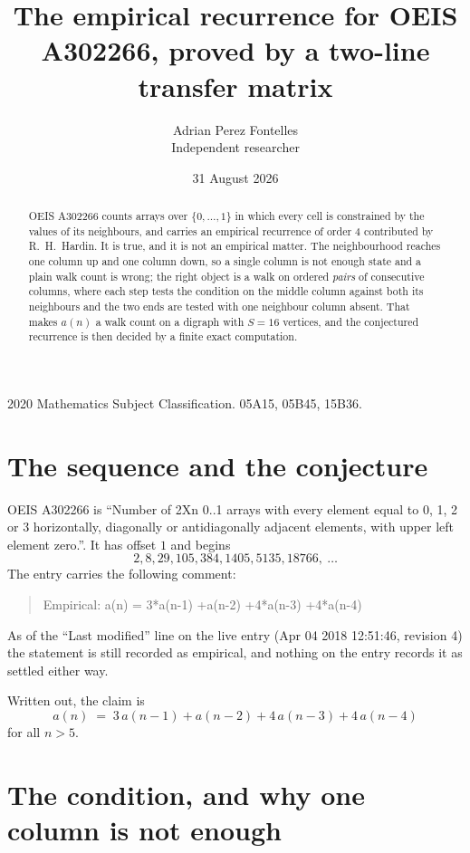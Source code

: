 \documentclass[11pt,a4paper]{article}
\title{The empirical recurrence for OEIS A302266, proved by a two-line transfer matrix}
\author{Adrian Perez Fontelles\\ \small Independent researcher}
\date{31 August 2026}
\theoremstyle{plain}
\theoremstyle{definition}
\begin{document}
\maketitle

\begin{abstract}
OEIS A302266 counts arrays over $\{0,\dots,1\}$ in which every cell is constrained by the
values of its neighbours, and carries an empirical recurrence of order $4$ contributed
by R.~H.~Hardin. It is true, and it is not an empirical matter. The neighbourhood reaches one
column up and one column down, so a single column is not enough state and a plain walk count
is wrong; the right object is a walk on ordered \emph{pairs} of consecutive columns, where
each step tests the condition on the middle column against both its neighbours and the two
ends are tested with one neighbour column absent. That makes $a(n)$ a walk count on a digraph
with $S=16$ vertices, and the conjectured recurrence is then decided by a finite exact
computation.
\end{abstract}

\noindent\small 2020 Mathematics Subject Classification. 05A15, 05B45, 15B36.\normalsize

\section{The sequence and the conjecture}

OEIS A302266 is ``Number of 2Xn 0..1 arrays with every element equal to 0, 1, 2 or 3 horizontally, diagonally or antidiagonally adjacent elements, with upper left element zero.''. It has offset $1$ and begins
\[
2, 8, 29, 105, 384, 1405, 5135, 18766,\ \dots
\]
The entry carries the following comment:
\begin{quote}\small
Empirical: a(n) = 3*a(n-1) +a(n-2) +4*a(n-3) +4*a(n-4)
\end{quote}
As of the ``Last modified'' line on the live entry (Apr 04 2018 12:51:46, revision 4) the statement is
still recorded as empirical, and nothing on the entry records it as settled either way.

Written out, the claim is
\begin{equation}\label{eq:conj}
a(n)\;=\;3\,a(n-1) + a(n-2) + 4\,a(n-3) + 4\,a(n-4)
\end{equation}
for all $n>5$.

\section{The condition, and why one column is not enough}
\end{document}
